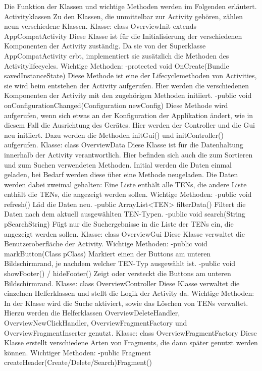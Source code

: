 Die Funktion der Klassen und wichtige Methoden werden im Folgenden erläutert.
Activityklassen
Zu den Klassen, die unmittelbar zur Activity gehören, zählen neun verschiedene Klassen.
Klasse: class OverviewInit extends AppCompatActivity
Diese Klasse ist für die Initialisierung der verschiedenen Komponenten der Activity zuständig. Da sie von der Superklasse AppCompatActivity erbt, implementiert sie zusätzlich die Methoden des Activitylifecycles.
Wichtige Methoden:
-protected void OnCreate(Bundle savedInstanceState)
Diese Methode ist eine der Lifecyclemethoden von Activities, sie wird beim entstehen der Activity aufgerufen. Hier werden die verschiedenen Komponenten der Activity mit den zugehörigen Methoden initiiert.
-public void onConfigurationChanged(Configuration newConfig)
Diese Methode wird aufgerufen, wenn sich etwas an der Konfiguration der Applikation ändert, wie in diesem Fall die Ausrichtung des Gerätes. Hier werden der Controller und die Gui neu initiiert. Dazu werden die Methoden initGui() und initController() aufgerufen.
Klasse: class OverviewData
Diese Klasse ist für die Datenhaltung innerhalb der Activity verantwortlich. Hier befinden sich auch die zum Sortieren und zum Suchen verwendeten Methoden. Initial werden die Daten einmal geladen, bei Bedarf werden diese über eine Methode neugeladen. Die Daten werden dabei zweimal gehalten: Eine Liste enthält alle TENs, die andere Liste enthält die TENs, die angezeigt werden sollen.
Wichtige Methoden:
-public void refresh()
Läd die Daten neu.
-public ArrayList<TEN> filterData()
Filtert die Daten nach dem aktuell ausgewählten TEN-Typen.
-public void search(String pSearchString)
Fügt nur die Suchergebnisse in die Liste der TENs ein, die angezeigt werden sollen.
Klasse: class OverviewGui
Diese Klasse verwaltet die Benutzeroberfläche der Activity.
Wichtige Methoden:
-public void markButton(Class pClass)
Markiert einen der Buttons am unteren Bildschirmrand, je nachdem welcher TEN-Typ ausgewählt ist.
-public void showFooter() / hideFooter()
Zeigt oder versteckt die Buttons am unteren Bildschirmrand.
Klasse: class OverviewController
Diese Klasse verwaltet die einzelnen Helferklassen und stellt die Logik der Activity da. 
Wichtige Methoden:
In der Klasse wird die Suche aktiviert, sowie das Löschen von TENs verwaltet. Hierzu werden die Helferklassen OverviewDeleteHandler, OverviewNewClickHandler, OverviewFragmentFactory und OverviewFragmentInserter genutzt. 
Klasse: class OverviewFragmentFactory
Diese Klasse erstellt verschiedene Arten von Fragments, die dann später genutzt werden können.
Wichtiger Methoden:
-public Fragment createHeader(Create/Delete/Search)Fragment()

